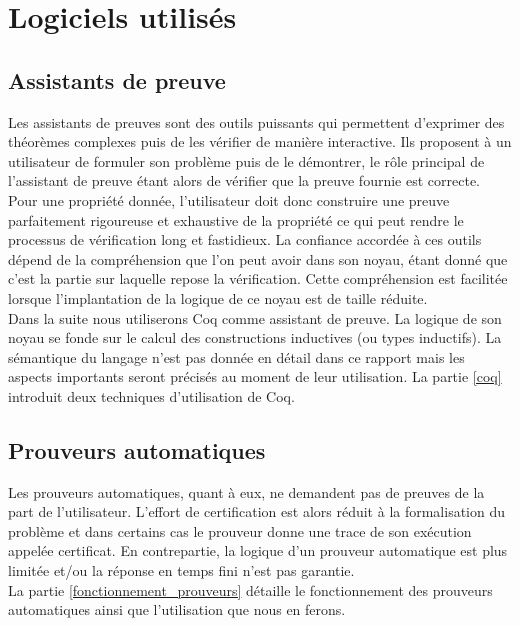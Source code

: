 \documentclass[11pt]{article}
\begin{document}
\newpage
\section{Logiciels utilisés}

\subsection{Assistants de preuve}\label{assistants}

Les assistants de preuves sont des outils puissants qui permettent d'exprimer des théorèmes complexes puis de les vérifier de manière interactive. Ils proposent à un utilisateur de formuler son problème puis de le démontrer, le rôle principal de l'assistant de preuve étant alors de vérifier que la preuve fournie est correcte. Pour une propriété donnée, l'utilisateur doit donc construire une preuve parfaitement rigoureuse et exhaustive de la propriété ce qui peut rendre le processus de vérification long et fastidieux. La confiance accordée à ces outils dépend de la compréhension que l'on peut avoir dans son noyau, étant donné que c'est la partie sur laquelle repose la vérification. Cette compréhension est facilitée lorsque l'implantation de la logique de ce noyau est de taille réduite. \\

Dans la suite nous utiliserons Coq comme assistant de preuve. La logique de son noyau se fonde sur le calcul des constructions inductives \cite{coq_intro} (ou types inductifs). La sémantique du langage n'est pas donnée en détail dans ce rapport mais les aspects importants seront précisés au moment de leur utilisation. La partie \ref{coq} introduit deux techniques d'utilisation de Coq. 

\subsection{Prouveurs automatiques}\label{prouveurs}

Les prouveurs automatiques, quant à eux, ne demandent pas de preuves de la part de l'utilisateur. L'effort de certification est alors réduit à la formalisation du problème et dans certains cas le prouveur donne une trace de son exécution appelée certificat. En contrepartie, la logique d'un prouveur automatique est plus limitée et/ou la réponse en temps fini n'est pas garantie.\\

La partie \ref{fonctionnement_prouveurs} détaille le fonctionnement des prouveurs automatiques ainsi que l'utilisation que nous en ferons.
\end{document}
